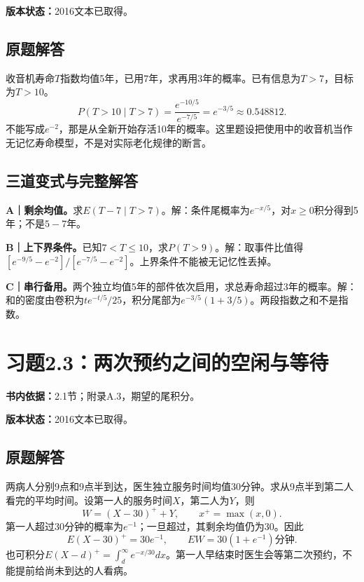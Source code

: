 \documentclass[
  11pt,
  a4paper,
  UTF8,fontset=fandol]{ctexart}
\let\OldSection\section
\renewcommand{\section}{\Needspace{7\baselineskip}\OldSection}
\let\OldSubsection\subsection
\renewcommand{\subsection}{\Needspace{5\baselineskip}\OldSubsection}
\begin{document}
\textbf{版本状态：}2016文本已取得。

\subsection{原题解答}\label{ux539fux9898ux89e3ux7b54-1}

收音机寿命\(T\)指数均值5年，已用7年，求再用3年的概率。已有信息为\(T>7\)，目标为\(T>10\)。
\[P(T>10\mid T>7)=\frac{e^{-10/5}}{e^{-7/5}}=\boxed{e^{-3/5}\approx0.548812}.\]
不能写成\(e^{-2}\)，那是从全新开始存活10年的概率。这里题设把使用中的收音机当作无记忆寿命模型，不是对实际老化规律的断言。

\subsection{三道变式与完整解答}\label{ux4e09ux9053ux53d8ux5f0fux4e0eux5b8cux6574ux89e3ux7b54-1}

\textbf{A｜剩余均值。}求\(E(T-7\mid T>7)\)。解：条件尾概率为\(e^{-x/5}\)，对\(x\ge0\)积分得到5年；不是\(5-7\)年。

\textbf{B｜上下界条件。}已知\(7<T\le10\)，求\(P(T>9)\)。解：取事件比值得\([e^{-9/5}-e^{-2}]/[e^{-7/5}-e^{-2}]\)。上界条件不能被无记忆性丢掉。

\textbf{C｜串行备用。}两个独立均值5年的部件依次启用，求总寿命超过3年的概率。解：和的密度由卷积为\(t e^{-t/5}/25\)，积分尾部为\(e^{-3/5}(1+3/5)\)。两段指数之和不是指数。

\newpage

\section{习题2.3：两次预约之间的空闲与等待}\label{ux4e60ux98982.3ux4e24ux6b21ux9884ux7ea6ux4e4bux95f4ux7684ux7a7aux95f2ux4e0eux7b49ux5f85}

\textbf{书内依据：}2.1节；附录A.3，期望的尾积分。

\textbf{版本状态：}2016文本已取得。

\subsection{原题解答}\label{ux539fux9898ux89e3ux7b54-2}

两病人分别9点和9点半到达，医生独立服务时间均值30分钟。求从9点半到第二人看完的平均时间。设第一人的服务时间\(X\)，第二人为\(Y\)，则
\[W=(X-30)^++Y,\qquad x^+=\max(x,0).\]
第一人超过30分钟的概率为\(e^{-1}\)；一旦超过，其剩余均值仍为30。因此
\[E(X-30)^+=30e^{-1},\qquad \boxed{EW=30(1+e^{-1})\text{分钟}}.\]
也可积分\(E(X-d)^+=\int_d^\infty e^{-x/30}dx\)。第一人早结束时医生会等第二次预约，不能提前给尚未到达的人看病。
\end{document}
